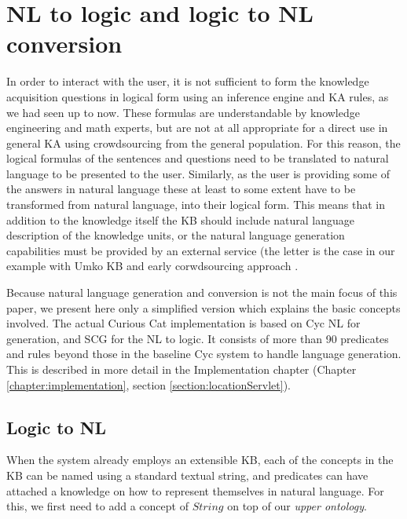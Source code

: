 \section{NL to logic and logic to NL conversion}
\label{section:nl}
In order to interact with the user, it is not sufficient to form the knowledge 
acquisition questions in logical form using an inference engine and KA rules,
as we had seen up to now. These formulas are understandable by knowledge 
engineering and math experts, but are not at all appropriate for a direct use 
in general KA using crowdsourcing from the general population. For this reason,
the logical formulas of the sentences and questions need to be translated to 
natural language to be presented to the user. Similarly, as the user is 
providing some of the answers in natural language these at least to some extent
have to be transformed from natural language, into their logical form.
This means that in addition to the knowledge itself the KB should include 
natural language description of the knowledge units, or the natural language 
generation capabilities must be provided by an external service (the letter is 
the case in our example with Umko KB \parencite{Bradesko2015} and
early corwdsourcing approach \parencite{Bradesko2012a}. 

Because natural language generation and conversion is not the main focus of 
this paper, we present here only a simplified version which explains the basic 
concepts involved. The actual Curious Cat implementation is based on 
Cyc NL\parencite{Baxter2005} for generation, and SCG\parencite{Schneider2015}
for the NL to logic. It consists of more than 90 predicates and rules beyond 
those in the baseline Cyc system to handle language generation. This is 
described in more detail in the Implementation chapter 
(Chapter \ref{chapter:implementation}, section \ref{section:locationServlet}).

\subsection{Logic to NL}
\label{section:logicNL}
When the system already employs an extensible KB, each of the concepts in the 
KB can be named using a standard textual string, and predicates can have 
attached a knowledge on how to represent themselves in natural language. For 
this, we first need to add a concept of $String$ on top of our 
\emph{upper ontology}.


